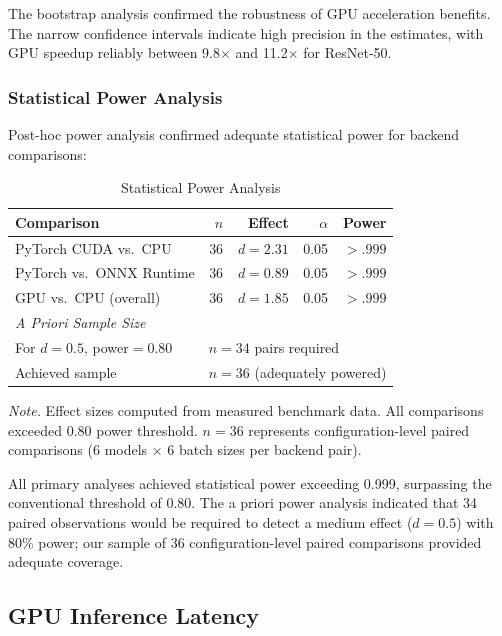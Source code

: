 \documentclass[10pt,twocolumn,a4paper]{article}
\theoremstyle{definition}
\theoremstyle{plain}
\begin{document}
The bootstrap analysis confirmed the robustness of GPU acceleration benefits. The narrow confidence intervals indicate high precision in the estimates, with GPU speedup reliably between 9.8$\times$ and 11.2$\times$ for ResNet-50.

\subsubsection{Statistical Power Analysis}

Post-hoc power analysis confirmed adequate statistical power for backend comparisons:

\begin{table}[t]
\centering
\caption{Statistical Power Analysis}
\label{tab:power}
\scriptsize
\setlength{\tabcolsep}{4pt}
\begin{tabular}{@{}lrrrr@{}}
\toprule
\textbf{Comparison} & \textbf{$n$} & \textbf{Effect} & \textbf{$\alpha$} & \textbf{Power} \\
\midrule
PyTorch CUDA vs.\ CPU & 36 & $d=2.31$ & 0.05 & $>.999$ \\
PyTorch vs.\ ONNX Runtime & 36 & $d=0.89$ & 0.05 & $>.999$ \\
GPU vs.\ CPU (overall) & 36 & $d=1.85$ & 0.05 & $>.999$ \\
\midrule
\multicolumn{5}{l}{\textit{A Priori Sample Size}} \\
For $d=0.5$, power$=0.80$ & \multicolumn{4}{l}{$n = 34$ pairs required} \\
Achieved sample & \multicolumn{4}{l}{$n = 36$ (adequately powered)} \\
\bottomrule
\end{tabular}

\vspace{0.5em}
\noindent\textit{Note.} Effect sizes computed from measured benchmark data. All comparisons exceeded 0.80 power threshold. $n = 36$ represents configuration-level paired comparisons (6 models $\times$ 6 batch sizes per backend pair).
\end{table}

All primary analyses achieved statistical power exceeding 0.999, surpassing the conventional threshold of 0.80. The a priori power analysis indicated that 34 paired observations would be required to detect a medium effect ($d = 0.5$) with 80\% power; our sample of 36 configuration-level paired comparisons provided adequate coverage.

\subsection{GPU Inference Latency}
\end{document}
